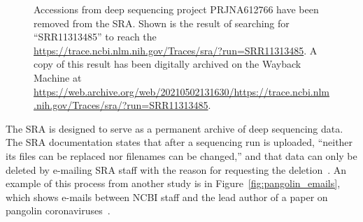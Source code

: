 \documentclass[9pt,twocolumn,twoside]{gsajnl_modified}
\begin{document}
\begin{figure}[]
\centering
{}
\caption{Accessions from deep sequencing project PRJNA612766 have been removed from the SRA.
Shown is the result of searching for ``SRR11313485'' to reach the \url{https://trace.ncbi.nlm.nih.gov/Traces/sra/?run=SRR11313485}.
A copy of this result has been digitally archived on the Wayback Machine at \url{https://web.archive.org/web/20210502131630/https://trace.ncbi.nlm.nih.gov/Traces/sra/?run=SRR11313485}.
}%
\label{fig:acc_removed}
\end{figure}

The SRA is designed to serve as a permanent archive of deep sequencing data.
The SRA documentation states that after a sequencing run is uploaded, ``neither its files can be replaced nor filenames can be changed,'' and that data can only be deleted by e-mailing SRA staff with the reason for requesting the deletion~\citep{SRA_deletion}.
An example of this process from another study is in Figure~\ref{fig:pangolin_emails}, which shows e-mails between NCBI staff and the lead author of a paper on pangolin coronaviruses~\citep{xiao2020isolation}.
\end{document}
